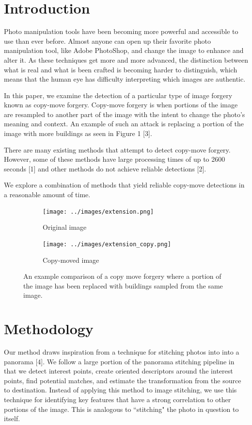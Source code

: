 \documentclass[12pt]{article}
\begin{document}
\section*{Introduction}
Photo manipulation tools have been becoming more powerful and accessible to use than ever before. Almost anyone can open up their favorite photo manipulation tool, like Adobe PhotoShop, and change the image to enhance and alter it. As these techniques get more and more advanced, the distinction between what is real and what is been crafted is becoming harder to distinguish, which means that the human eye has difficulty interpreting which images are authentic.

In this paper, we examine the detection of a particular type of image forgery known as copy-move forgery. Copy-move forgery is when portions of the image are resampled to another part of the image with the intent to change the photo's meaning and context. An example of such an attack is replacing a portion of the image with more buildings as seen in Figure 1 [3].

There are many existing methods that attempt to detect copy-move forgery. However, some of these methods have large processing times of up to 2600 seconds [1] and other methods do not achieve reliable detections [2].

We explore a combination of methods that yield reliable copy-move detections in a reasonable amount of time.


\begin{figure}
\centering
\begin{subfigure}{.5\textwidth}
  \centering
  \texttt{[image: ../images/extension.png]}
  \caption{Original image}
  \label{fig:sub1}
\end{subfigure}%
\begin{subfigure}{.5\textwidth}
  \centering
  \texttt{[image: ../images/extension\_copy.png]}
  \caption{Copy-moved image}
  \label{fig:sub2}
\end{subfigure}
\caption{An example comparison of a copy move forgery where a portion of the image has been replaced with buildings sampled from the same image.}
\label{fig:test}
\end{figure}


\section*{Methodology}
Our method draws inspiration from a technique for stitching photos into into a panorama [4]. We follow a large portion of the panorama stitching pipeline in that we detect interest points, create oriented descriptors around the interest points, find potential matches, and estimate the transformation from the source to destination. Instead of applying this method to image stitching, we use this technique for identifying key features that have a strong correlation to other portions of the image. This is analogous to ``stitching" the photo in question to itself.
\end{document}
